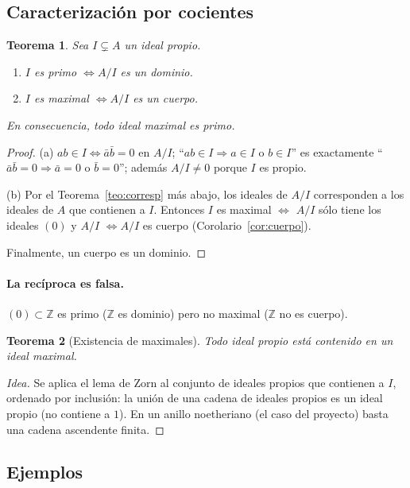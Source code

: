 \documentclass[11pt,a4paper]{article}
\newcommand{\ZZ}{\mathbb{Z}}
\theoremstyle{plain}
\newtheorem{teorema}{Teorema}[section]
\theoremstyle{definition}
\theoremstyle{remark}
\begin{document}
\subsection{Caracterización por cocientes}

\begin{teorema}\label{teo:cocientes}
Sea $I\subsetneq A$ un ideal propio.
\begin{enumerate}[label=(\alph*),itemsep=1pt]
\item $I$ es primo $\iff A/I$ es un dominio.
\item $I$ es maximal $\iff A/I$ es un cuerpo.
\end{enumerate}
En consecuencia, \emph{todo ideal maximal es primo}.
\end{teorema}
\begin{proof}
(a) $ab\in I\iff\bar a\bar b=0$ en $A/I$; ``$ab\in I\Rightarrow a\in I$ o $b\in I$'' es exactamente ``$\bar a\bar b=0\Rightarrow\bar a=0$ o $\bar b=0$''; además $A/I\ne0$ porque $I$ es propio.

(b) Por el Teorema~\ref{teo:corresp} más abajo, los ideales de $A/I$ corresponden a los ideales de $A$ que contienen a $I$. Entonces $I$ es maximal $\iff$ $A/I$ sólo tiene los ideales $(0)$ y $A/I$ $\iff A/I$ es cuerpo (Corolario~\ref{cor:cuerpo}).

Finalmente, un cuerpo es un dominio.
\end{proof}

\paragraph{La recíproca es falsa.} $(0)\subset\ZZ$ es primo ($\ZZ$ es dominio) pero no maximal ($\ZZ$ no es cuerpo).

\begin{teorema}[Existencia de maximales]
Todo ideal propio está contenido en un ideal maximal.
\end{teorema}
\begin{proof}[Idea]
Se aplica el lema de Zorn al conjunto de ideales propios que contienen a $I$, ordenado por inclusión: la unión de una cadena de ideales propios es un ideal propio (no contiene a $1$). En un anillo noetheriano (el caso del proyecto) basta una cadena ascendente finita.
\end{proof}

\subsection{Ejemplos}
\end{document}
